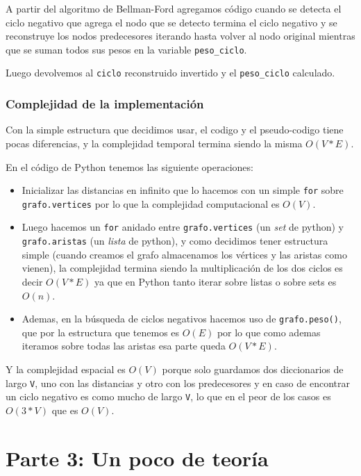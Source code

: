 \documentclass[titlepage,a4paper]{article}
\begin{document}
A partir del algoritmo de Bellman-Ford agregamos código cuando se detecta el
ciclo negativo que agrega el nodo que se detecto termina el ciclo negativo y se
reconstruye los nodos predecesores iterando hasta volver al nodo original
mientras que se suman todos sus pesos en la variable \texttt{peso\_ciclo}.

Luego devolvemos al \texttt{ciclo} reconstruido invertido y el \texttt{peso\_ciclo} calculado.

\subsubsection{Complejidad de la implementación}
\label{sec:org29f8920}

Con la simple estructura que decidimos usar, el codigo y el pseudo-codigo tiene
pocas diferencias, y la complejidad temporal termina siendo la misma \(O(V * E)\).

En el código de Python tenemos las siguiente operaciones:
\begin{itemize}
\item Inicializar las distancias en infinito que lo hacemos con un simple \texttt{for}
sobre \texttt{grafo.vertices} por lo que la complejidad computacional es \(O(V)\).
\item Luego hacemos un \texttt{for} anidado entre \texttt{grafo.vertices} (un \emph{set} de python) y
\texttt{grafo.aristas} (un \emph{lista} de python), y como decidimos tener estructura
simple (cuando creamos el grafo almacenamos los vértices y las aristas como
vienen), la complejidad termina siendo la multiplicación de los dos ciclos es
decir \(O(V * E)\) ya que en Python tanto iterar sobre listas o sobre sets es
\(O(n)\).
\item Ademas, en la búsqueda de ciclos negativos hacemos uso de \texttt{grafo.peso()}, que
por la estructura que tenemos es \(O(E)\) por lo que como ademas iteramos sobre
todas las aristas esa parte queda \(O(V * E)\).
\end{itemize}

Y la complejidad espacial es \(O(V)\) porque solo guardamos dos diccionarios de
largo \texttt{V}, uno con las distancias y otro con los predecesores y en caso de
encontrar un ciclo negativo es como mucho de largo \texttt{V}, lo que en el peor de los
casos es \(O(3*V)\) que es \(O(V)\).

\newpage

\section{Parte 3: Un poco de teoría}
\label{sec:org44ea8a2}
\end{document}
